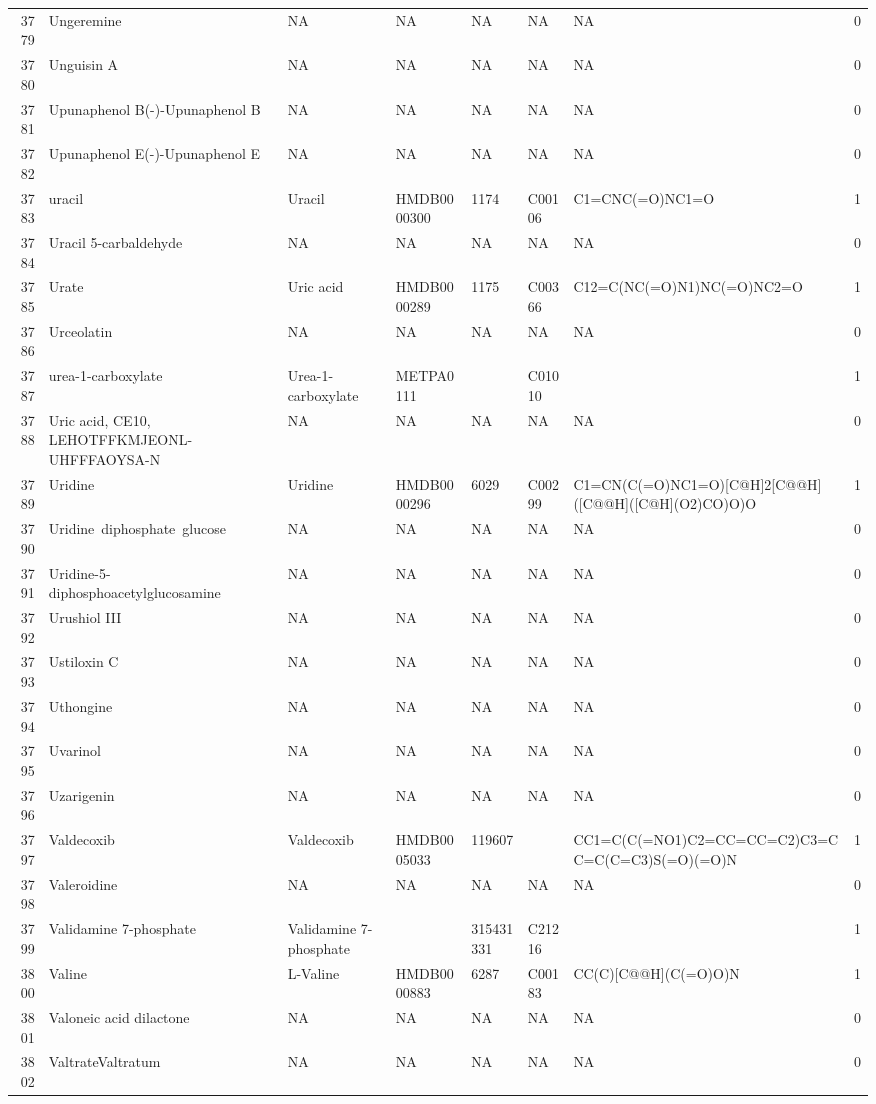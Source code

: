 \documentclass[a4paper]{article}
\begin{document}
\begin{longtable}{rlllllll}
  3779 & Ungeremine & NA & NA & NA & NA & NA & 0 \\ 
  3780 & Unguisin A & NA & NA & NA & NA & NA & 0 \\ 
  3781 & Upunaphenol B(-)-Upunaphenol B & NA & NA & NA & NA & NA & 0 \\ 
  3782 & Upunaphenol E(-)-Upunaphenol E & NA & NA & NA & NA & NA & 0 \\ 
  3783 & uracil & Uracil & HMDB0000300 & 1174 & C00106 & C1=CNC(=O)NC1=O & 1 \\ 
  3784 & Uracil 5-carbaldehyde & NA & NA & NA & NA & NA & 0 \\ 
  3785 & Urate & Uric acid & HMDB0000289 & 1175 & C00366 & C12=C(NC(=O)N1)NC(=O)NC2=O & 1 \\ 
  3786 & Urceolatin & NA & NA & NA & NA & NA & 0 \\ 
  3787 & urea-1-carboxylate & Urea-1-carboxylate & METPA0111 &  & C01010 &  & 1 \\ 
  3788 & Uric acid, CE10, LEHOTFFKMJEONL-UHFFFAOYSA-N & NA & NA & NA & NA & NA & 0 \\ 
  3789 & Uridine & Uridine & HMDB0000296 & 6029 & C00299 & C1=CN(C(=O)NC1=O)[C@H]2[C@@H]([C@@H]([C@H](O2)CO)O)O & 1 \\ 
  3790 & Uridine diphosphate glucose & NA & NA & NA & NA & NA & 0 \\ 
  3791 & Uridine-5-diphosphoacetylglucosamine & NA & NA & NA & NA & NA & 0 \\ 
  3792 & Urushiol III & NA & NA & NA & NA & NA & 0 \\ 
  3793 & Ustiloxin C & NA & NA & NA & NA & NA & 0 \\ 
  3794 & Uthongine & NA & NA & NA & NA & NA & 0 \\ 
  3795 & Uvarinol & NA & NA & NA & NA & NA & 0 \\ 
  3796 & Uzarigenin & NA & NA & NA & NA & NA & 0 \\ 
  3797 & Valdecoxib & Valdecoxib & HMDB0005033 & 119607 &  & CC1=C(C(=NO1)C2=CC=CC=C2)C3=CC=C(C=C3)S(=O)(=O)N & 1 \\ 
  3798 & Valeroidine & NA & NA & NA & NA & NA & 0 \\ 
  3799 & Validamine 7-phosphate & Validamine 7-phosphate &  & 315431331 & C21216 &  & 1 \\ 
  3800 & Valine & L-Valine & HMDB0000883 & 6287 & C00183 & CC(C)[C@@H](C(=O)O)N & 1 \\ 
  3801 & Valoneic acid dilactone & NA & NA & NA & NA & NA & 0 \\ 
  3802 & ValtrateValtratum & NA & NA & NA & NA & NA & 0 \\ 

\end{longtable}
\end{document}
